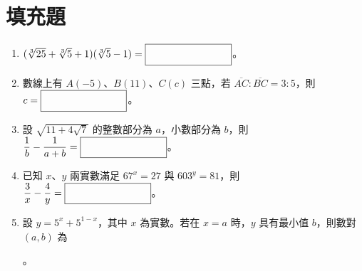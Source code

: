 \documentclass[12pt]{article}
\newcommand*{\blank}[1]{\rule[-.7\baselineskip]{0pt}{1.8\baselineskip}\fbox{\rule[-.4\baselineskip]{0pt}{1.2\baselineskip}\hspace{#1}}}
\newcommand*{\fraction}[2]{\rule[-.7\baselineskip]{0pt}{1.8\baselineskip}\dfrac{#1}{#2}}
\begin{document}
\section{填充題}
\begin{enumerate}[label=\Alph*.,align=left,leftmargin=*,labelsep=.6em]
  \item $(\sqrt[3]{25}+\sqrt[3]{5}+1)(\sqrt[3]{5}-1) = \blank{8em}$。
  \item 數線上有 $A(-5)$、$B(11)$、$C(c)$ 三點，若 $\overline{AC}:\overline{BC} = 3:5$，則 $c = \blank{8em}$。
  \item 設 $\sqrt{11+4\sqrt{7}}$ 的整數部分為 $a$，小數部分為 $b$，則 $\fraction{1}{b} - \fraction{1}{a+b} = \blank{8em}$。
  \item 已知 $x$、$y$ 兩實數滿足 $67^x = 27$ 與 $603^y = 81$，則 $\fraction{3}{x} - \fraction{4}{y} = \blank{8em}$。
  \item 設 $y = 5^x + 5^{1-x}$，其中 $x$ 為實數。若在 $x = a$ 時，$y$ 具有最小值 $b$，則數對 $(a, b)$ 為 \blank{8em}。
\end{enumerate}
\end{document}
